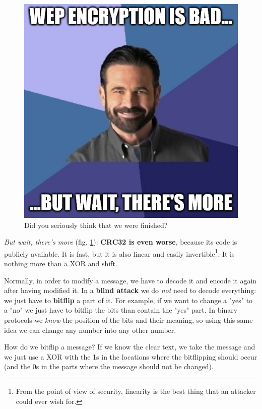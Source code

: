 \begin{figure}[h]
    \centering
    \includegraphics[scale=0.5]{img/meme_wep_wait_theres_more.png}
    \decoRule
    \caption{Did you seriously think that we were finished?}
    \label{fig:meme_wep_wait_theres_more}
\end{figure}

\textit{But wait, there's more} (fig. \ref{fig:meme_wep_wait_theres_more}): \textbf{CRC32 is even worse}, because its code is publicly available. It is fast, but it is also linear and easily invertible\footnote{From the point of view of security, linearity is the best thing that an attacker could ever wish for.}. It is nothing more than a XOR and shift.

Normally, in order to modify a message, we have to decode it and encode it again after having modified it. In a \textbf{blind attack} we do \textit{not} need to decode everything: we just have to \textbf{bitflip} a part of it. For example, if we want to change a "yes" to a "no" we just have to bitflip the bits than contain the "yes" part. In binary protocols we \textit{know} the position of the bits and their meaning, so using this same idea we can change any number into any other number.

How do we bitflip a message? If we know the clear text, we take the message and we just use a XOR with the 1s in the locations where the bitflipping should occur (and the 0s in the parts where the message should not be changed).

